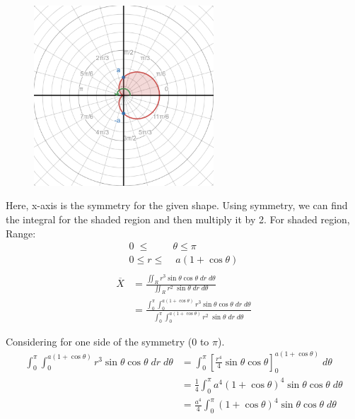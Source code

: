 \documentclass{article}
\begin{document}
\newpage
\subsection{}%

\large{

\begin{figure}[h]
    \centering
    \includegraphics[width=0.6\textwidth]{1-a.png}
\end{figure}

\vspace{1cm}

Here, x-axis is the symmetry for the given shape. Using symmetry, we can find the integral for the shaded region and then multiply it by 2.
For shaded region, Range:
\begin{align*}
    0 \; \leq \; &\theta \leq \pi \\
    0 \leq r \leq & \; a(1+\cos \theta) \\
\end{align*}
\begin{align*}
\overline{X}	& = \frac{\iint_R r^3 \sin \theta \cos \theta \; dr \; d\theta}{\iint_R r^2 \; \sin \theta \; dr \; d\theta} \\
				& = \frac{\int^\pi_0 \int^{a(1+\cos \theta)}_0 r^3 \sin \theta \cos \theta \; dr \; d\theta}{\int^\pi_0 \int^{a(1+\cos \theta)}_0 r^2 \; \sin \theta \; dr \; d\theta}
\end{align*}

Considering for one side of the symmetry ($0$ to $\pi$).
\begin{align*}
    \int^\pi_0 \int^{a(1+\cos \theta)}_0 r^3 \sin \theta \cos \theta \; dr \; d\theta & = \int^\pi_0 \left[ \frac{r^4}{4} \sin \theta \cos \theta \right]^{a(1+\cos \theta)}_0 \; d\theta \\
    & = \frac{1}{4} \int^\pi_0 a^4 (1+\cos \theta)^4 \sin \theta \cos \theta \; d\theta \\
    & = \frac{a^4}{4} \int^\pi_0 (1+\cos \theta)^4 \sin \theta \cos \theta \; d\theta \\
\end{align*}

}
\end{document}
